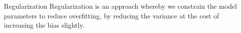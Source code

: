 \begin{frame}{Regularization}
%
%
%
%
Regularization is an approach whereby we constrain the model parameters
to reduce overfitting, by reducing the variance
at the cost of increasing the bias slightly. 

\end{frame}
